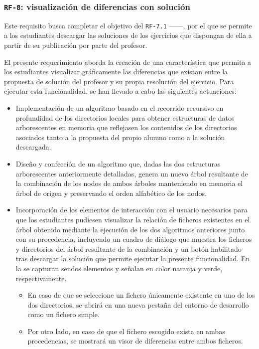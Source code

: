 \subsubsection{\texttt{RF-8}: visualización de diferencias con solución}
\label{subsec:rf8}

Este requisito busca completar el objetivo del \texttt{RF-7.1} ------, por el que se permite a los estudiantes descargar las soluciones de los ejercicios que dispongan de ella a partir de su publicación por parte del profesor.

El presente requerimiento aborda la creación de una característica que permita a los estudiantes visualizar gráficamente las diferencias que existan entre la propuesta de solución del profesor y su propia resolución del ejercicio. Para ejecutar esta funcionalidad, se han llevado a cabo las siguientes actuaciones:
\begin{itemize}
    \item Implementación de un algoritmo basado en el recorrido recursivo en profundidad de los directorios locales para obtener estructuras de datos arborescentes en memoria que reflejasen los contenidos de los directorios asociados tanto a la propuesta del propio alumno como a la solución descargada.
    \item Diseño y confección de un algoritmo que, dadas las dos estructuras arborescentes anteriormente detalladas, genera un nuevo árbol resultante de la combinación de los nodos de ambos árboles manteniendo en memoria el árbol de origen y preservando el orden alfabético de los nodos.
    \item Incorporación de los elementos de interacción con el usuario necesarios para que los estudiantes pudiesen visualizar la relación de ficheros existentes en el árbol obtenido mediante la ejecución de los dos algoritmos anteriores junto con su procedencia, incluyendo un cuadro de diálogo que muestra los ficheros y directorios del árbol resultante de la combinación y un botón habilitado tras descargar la solución que permite ejecutar la presente funcionalidad. En la  se capturan sendos elementos y señalan en color naranja y verde, respectivamente.
    \begin{itemize}
        \item En caso de que se seleccione un fichero únicamente existente en uno de los dos directorios, se abrirá en una nueva pestaña del entorno de desarrollo como un fichero simple.
        \item Por otro lado, en caso de que el fichero escogido exista en ambas procedencias, se mostrará un visor de diferencias entre ambos ficheros.
    \end{itemize}
\end{itemize}

